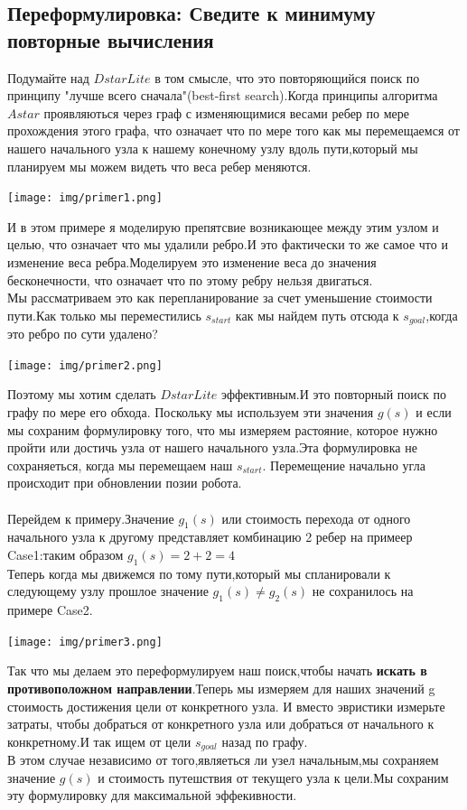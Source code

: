 \documentclass[12pt]{article}
\begin{document}
\subsection*{Переформулировка: Сведите к минимуму повторные вычисления}
Подумайте над $D star Lite$ в том смысле, что это повторяющийся поиск по принципу "лучше всего сначала"(best-first search).Когда принципы алгоритма $A star$ проявляються через граф с изменяющимися весами ребер по мере прохождения этого графа, что означает что по мере того как мы перемещаемся от нашего начального узла к нашему конечному узлу вдоль пути,который мы планируем мы можем видеть что веса ребер меняются.
\begin{center}
        \texttt{[image: img/primer1.png]}
\end{center}
И в этом примере я моделирую препятсвие возникающее между этим узлом и целью, что означает что мы удалили ребро.И это фактически то же самое что и изменение веса ребра.Моделируем это изменение веса до значения  бесконечности, что означает что по этому ребру нельзя двигаться.\\
Мы рассматриваем это как перепланирование за счет уменьшение стоимости пути.Как только мы переместились $ s_{start}$ как мы найдем путь отсюда к $ s_{goal}$,когда это ребро по сути удалено?
\begin{center}
        \texttt{[image: img/primer2.png]}
\end{center}
Поэтому мы хотим сделать $D star Lite$ эффективным.И это повторный поиск по графу по мере его обхода. Поскольку мы используем эти значения $g(s)$ и если мы сохраним формулировку того, что мы измеряем растояние, которое нужно пройти или достичь узла от нашего начального узла.Эта формулировка не сохраняеться, когда мы перемещаем наш $ s_{start}$. Перемещение начально угла происходит при обновлении позии робота. \\
\\
Перейдем к примеру.Значение $g_1(s)$ или стоимость перехода от одного начального узла к другому  представляет комбинацию 2 ребер на примеер Case1:таким образом $g_1(s)=2+2=4$\\Теперь когда мы движемся по тому пути,который мы спланировали к следующему узлу прошлое значение $g_1(s)\neq g_2(s)$ не сохранилось  на примере Case2.
\begin{center}
        \texttt{[image: img/primer3.png]}
\end{center}
Так что мы делаем это переформулируем наш поиск,чтобы начать \textbf{искать в противоположном направлении}.Теперь мы измеряем для наших значений g стоимость достижения цели от конкретного узла. И вместо эвристики измерьте затраты, чтобы добраться от конкретного узла или добраться от начального к конкретному.И так ищем от цели $ s_{goal}$ назад по графу. \\
В этом случае независимо от того,являеться ли узел начальным,мы сохраняем значение $g(s)$ и стоимость путешствия от текущего узла к цели.Мы сохраним эту формулировку для максимальной эффекивности.
\newpage
\end{document}
